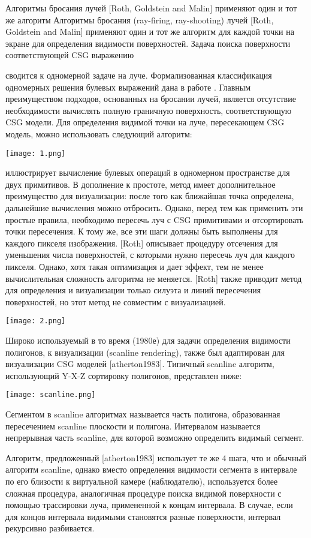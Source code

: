 {{{{{{Алгоритмы бросания лучей [Roth, Goldstein and Malin] применяют один и тот же алгоритм 
Алгоритмы бросания (ray-firing, ray-shooting) лучей [Roth, Goldstein and Malin] применяют один и тот же алгоритм для каждой точки на экране для определения видимости поверхностей. Задача поиска поверхности соответствующей CSG выражению {сводится к одномерной задаче на луче. Формализованная классификация одномерных  решения булевых выражений дана в работе . Главным преимуществом подходов, основанных на бросании лучей, является отсутствие необходимости вычислять полную граничную поверхность, соответствующую CSG модели. Для определения видимой точки на луче, пересекающем CSG модель, можно использовать следующий алгоритм:

\texttt{[image: 1.png]}}

 иллюстрирует вычисление булевых операций в одномерном пространстве для двух примитивов. В дополнение к простоте, метод имеет дополнительное преимущество для визуализации: после того как ближайшая точка определена, дальнейшие вычисления можно отбросить. Однако, перед тем как применить эти простые правила, необходимо пересечь луч с CSG примитивами и отсортировать точки пересечения. К тому же, все эти шаги должны быть выполнены для каждого пикселя изображения. [Roth] описывает процедуру отсечения для уменьшения числа поверхностей, с которыми нужно пересечь луч для каждого пикселя. Однако, хотя такая оптимизация и дает эффект, тем не менее вычислительная сложность алгоритма не меняется. [Roth] также приводит метод для определения и визуализации только силуэта и линий пересечения поверхностей, но этот метод не совместим с  визуализацией.

\texttt{[image: 2.png]}}

Широко используемый в то время (1980е) для задачи определения видимости полигонов,  к визуализации (scanline rendering), также был адаптирован для визуализации CSG моделей [atherton1983]. Типичный scanline алгоритм, использующий Y-X-Z сортировку полигонов, представлен ниже:

\texttt{[image: scanline.png]}}

Сегментом в scanline алгоритмах называется часть полигона, образованная пересечением scanline плоскости и полигона.
Интервалом называется непрерывная часть scanline, для которой возможно определить видимый сегмент. 

Алгоритм, предложенный [atherton1983] использует те же 4 шага, что и обычный алгоритм scanline, однако вместо определения видимости сегмента в интервале по его близости к виртуальной камере (наблюдателю), используется более сложная процедура, аналогичная процедуре поиска видимой поверхности с помощью трассировки луча, примененной к концам интервала. В случае, если для концов интервала видимыми становятся разные поверхности, интервал рекурсивно разбивается.

}}}}
